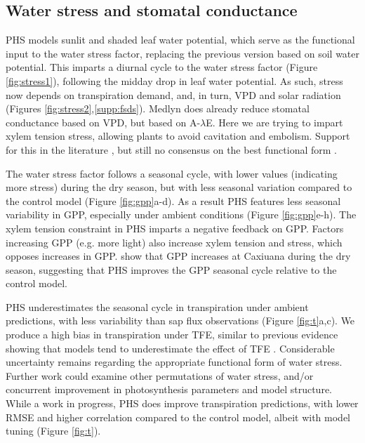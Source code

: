 \documentclass[draft,linenumbers]{agujournal}
\begin{document}
\subsection{Water stress and stomatal conductance}

    PHS models sunlit and shaded leaf water potential, which serve as the functional input to the water stress factor, 
    replacing the previous version based on soil water potential.
    This imparts a diurnal cycle to the water stress factor (Figure \ref{fig:stress1}), following the midday drop in leaf water potential.
    As such, stress now depends on transpiration demand, and, in turn, VPD and solar radiation (Figures \ref{fig:stress2},\ref{supp:fsds}).
    Medlyn does already reduce stomatal conductance based on VPD, but based on A-$\lambda$E.
    Here we are trying to impart xylem tension stress, allowing plants to avoid cavitation and embolism.
    Support for this in the literature \citep{novick2016a,sperry2017}, but still no consensus on the best functional form \citep{zhou2013}. 
    
    The water stress factor follows a seasonal cycle, with lower values (indicating more stress) during the dry season, 
    but with less seasonal variation compared to the control model (Figure \ref{fig:gpp}a-d).
    As a result PHS features less seasonal variability in GPP, especially under ambient conditions (Figure \ref{fig:gpp}e-h).
    The xylem tension constraint in PHS imparts a negative feedback on GPP.
    Factors increasing GPP (e.g. more light) also increase xylem tension and stress, which opposes increases in GPP.
    \cite{restrepo2017} show that GPP increases at Caxiuana during the dry season, suggesting that PHS improves the GPP seasonal cycle relative to the control model.
    
    PHS underestimates the seasonal cycle in transpiration under ambient predictions, with less variability than sap flux observations (Figure \ref{fig:t}a,c).
    We produce a high bias in transpiration under TFE, similar to previous evidence showing that models tend to underestimate the effect of TFE \citep{powell2013}.
    Considerable uncertainty remains regarding the appropriate functional form of water stress.
    Further work could examine other permutations of water stress, and/or concurrent improvement in photosynthesis parameters and model structure.
    While a work in progress, PHS does improve transpiration predictions, 
    with lower RMSE and higher correlation compared to the control model, albeit with model tuning (Figure \ref{fig:t}).
\end{document}
